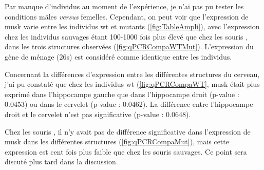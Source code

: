 	Par manque d'individus au moment de l'expérience, je n'ai pas pu tester les conditions mâles \emph{versus} femelles. Cependant, on peut voir que l'expression de \gls{musk} varie entre les individus \gls{wt} et mutants (\cref{fig:TableAmpli}), avec l'expression chez les individus sauvages étant 100-1000 fois plus élevé que chez les souris \mcrd, dans les trois structures observées (\cref{fig:qPCRCompaWTMut}). L'expression du gène de ménage (\gls{26s}) est considéré comme identique entre les individus.
	
	Concernant la différences d'expression entre les différentes structures du cerveau, j'ai pu constaté que chez les individus \gls{wt} (\cref{fig:qPCRCompaWT}, \gls{musk} était plus exprimé dans l'hippocampe gauche que dans l'hippocampe droit (p-value : 0.0453) ou dans le cervelet (p-value : 0.0462). La différence entre l'hippocampe droit et le cervelet n'est pas significative (p-value : 0.0648).
	
	Chez les souris \mcrd, il n'y avait pas de différence significative dans l'expression de \gls{musk} dans les différentes structures (\cref{fig:qPCRCompaMut}), mais cette expression est cent fois plus faible que chez les souris sauvages. Ce point sera discuté plus tard dans la discussion.
	
